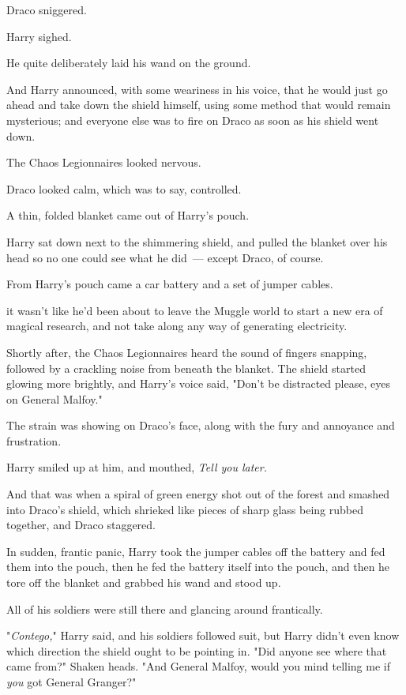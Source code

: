 Draco sniggered.

Harry sighed.

He quite deliberately laid his wand on the ground.

And Harry announced, with some weariness in his voice, that he would just go
ahead and take down the shield himself, using some method that would remain
mysterious; and everyone else was to fire on Draco as soon as his shield went
down.

The Chaos Legionnaires looked nervous.

Draco looked calm, which was to say, controlled.

A thin, folded blanket came out of Harry's pouch.

Harry sat down next to the shimmering shield, and pulled the blanket over his
head so no one could see what he did~--- except Draco, of course.

From Harry's pouch came a car battery and a set of jumper cables.

{\el} it wasn't like he'd been about to leave the Muggle world to start a new
era of magical research, and not take along any way of generating electricity.

Shortly after, the Chaos Legionnaires heard the sound of fingers snapping,
followed by a crackling noise from beneath the blanket. The shield started
glowing more brightly, and Harry's voice said, "Don't be distracted please,
eyes on General Malfoy."

The strain was showing on Draco's face, along with the fury and annoyance and
frustration.

Harry smiled up at him, and mouthed, \emph{Tell you later.}

And that was when a spiral of green energy shot out of the forest and smashed
into Draco's shield, which shrieked like pieces of sharp glass being rubbed
together, and Draco staggered.

In sudden, frantic panic, Harry took the jumper cables off the battery and fed
them into the pouch, then he fed the battery itself into the pouch, and then he
tore off the blanket and grabbed his wand and stood up.

All of his soldiers were still there and glancing around frantically.

"\emph{Contego,}" Harry said, and his soldiers followed suit, but Harry didn't
even know which direction the shield ought to be pointing in. "Did anyone see
where that came from?" Shaken heads. "And General Malfoy, would you mind
telling me if \emph{you} got General Granger?"

